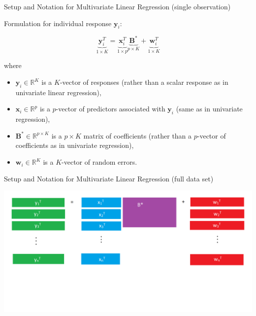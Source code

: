 \documentclass[notes]{beamer}       %
\begin{document}
\begin{frame}{Setup and Notation for Multivariate Linear Regression (single observation)}{}



     Formulation for individual response \(\boldsymbol{y}_i \):

\begin{equation}
\underbrace{\boldsymbol{y}_i^T}_{ 1 \times K} = \underbrace{\boldsymbol{x}_i^T}_{1 \times p} \underbrace{\boldsymbol{B}^*}_{p \times K} + \underbrace{\boldsymbol{w}_i^T}_{1 \times K}
\end{equation}

where

\begin{itemize}

\item \(\boldsymbol{y}_i \in \mathbb{R}^K\) is a \(K\)-vector of responses (rather than a scalar response as in univariate linear regression),

\item \(\boldsymbol{x}_i \in \mathbb{R}^p\) is a \(p\)-vector of predictors associated with \(\boldsymbol{y}_i\) (same as in univariate regression),

\item \(\boldsymbol{B}^* \in \mathbb{R}^{p \times K}\) is a \(p \times K\) matrix of coefficients (rather than a \(p\)-vector of coefficients as in univariate regression),

\item \(\boldsymbol{w}_i \in \mathbb{R}^K\) is a \(K\)-vector of random errors.

\end{itemize}

\end{frame}

\begin{frame}{Setup and Notation for Multivariate Linear Regression (full data set)}{}
\begin{center}
\includegraphics[scale=0.22]{diagram2.png}
\end{center}
\end{frame}
\end{document}
